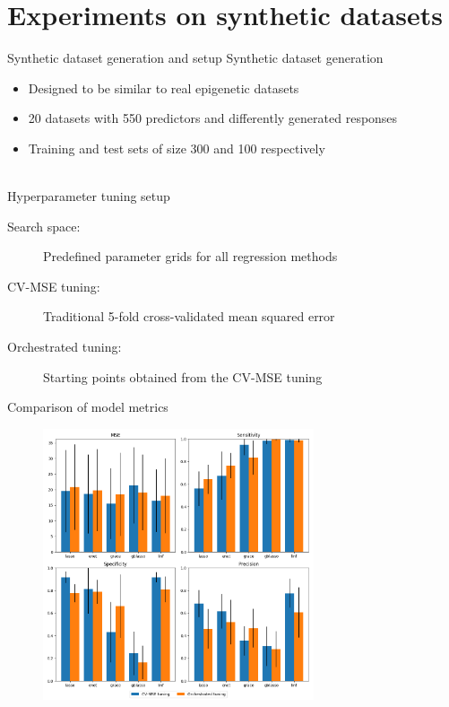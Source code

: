 \documentclass{beamer}
\begin{document}
\section{Experiments on synthetic datasets}
\begin{frame}{Synthetic dataset generation and setup}
Synthetic dataset generation
\begin{small}
\begin{itemize}
	\item Designed to be similar to real epigenetic datasets
	\item 20 datasets with 550 predictors and differently generated responses
	\item Training and test sets of size 300 and 100 respectively
\end{itemize}
\end{small}
~\\
Hyperparameter tuning setup
\begin{small}
\begin{description}
	\item[Search space:] Predefined parameter grids for all regression methods
	\item[CV-MSE tuning:] Traditional 5-fold cross-validated mean squared error
	\item[Orchestrated tuning:] Starting points obtained from the CV-MSE tuning
\end{description}
\end{small}
\end{frame}



\begin{frame}{Comparison of model metrics}
\begin{figure}
	\includegraphics[width=8cm,height=8cm]{tuning_method_comparison}
\end{figure}
\end{frame}
\end{document}
